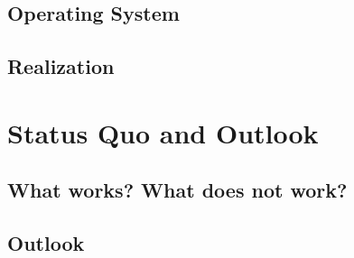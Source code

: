 \documentclass{report}
\begin{document}
\section{Operating System}
\label{sec:os}

\section{Realization}
\label{sec:realization}


\chapter{Status Quo and Outlook}
\label{chap:status}
\section{What works? What does not work?}
\label{sec:what}

\section{Outlook}
\label{sec:outlook}

\end{document}
